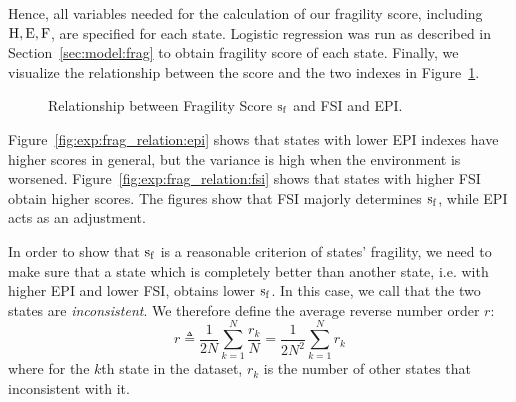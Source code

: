 Hence, all variables needed for the calculation of our fragility score, including $\operatorname*{{H}}, \operatorname*{E}, \operatorname*{F}$, are specified for each state. Logistic regression was run as described in Section~\ref{sec:model:frag} to obtain fragility score of each state. Finally, we visualize the relationship between the score and the two indexes in Figure~\ref{fig:exp:frag_relation}.
\begin{figure}[htbp]
    \centering
   \caption{Relationship between Fragility Score $\operatorname*{s_f}$ and FSI and EPI.} 
   \label{fig:exp:frag_relation}
\end{figure}
Figure~\ref{fig:exp:frag_relation:epi} shows that states with lower EPI indexes have higher scores in general, but the variance is high when the environment is worsened. Figure~\ref{fig:exp:frag_relation:fsi} shows that states with higher FSI obtain higher scores. 
The figures show that FSI majorly determines $\operatorname*{s_f}$, while EPI acts as an adjustment.

In order to show that $\operatorname*{s_f}$ is a reasonable criterion of states' fragility, we need to make sure that a state which is completely better than another state, i.e. with higher EPI and lower FSI, obtains lower $\operatorname*{s_f}$. In this case, we call that the two states are \emph{inconsistent}.
We therefore define the average reverse number order $r$: 
\begin{equation}
   r\triangleq \frac{1}{2N}\sum_{k=1}^N \frac{r_k}{N}  = \frac{1}{2N^2}\sum_{k=1}^N r_k
   \label{eqn:exp:reverse_order}
\end{equation}
where for the $k$th state in the dataset, $r_k$ is the number of other states that inconsistent with it.

